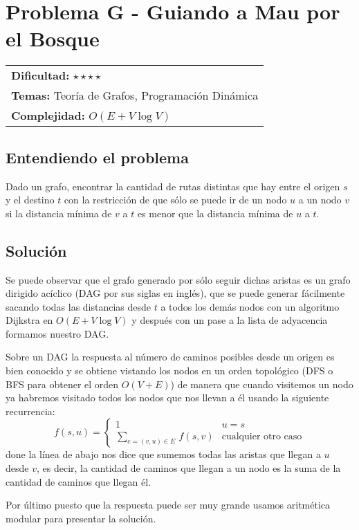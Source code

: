 \section{Problema G - Guiando a Mau por el Bosque}

\hfill
\begin{tabular}{@{}l@{}}
\textbf{Dificultad:} $\star \star \star \star$ \\
\textbf{Temas:} Teoría de Grafos, Programación Dinámica \\
\textbf{Complejidad:} $O(E + V \log V)$
\end{tabular}

\subsection*{Entendiendo el problema}
Dado un grafo, encontrar la cantidad de rutas distintas que hay entre el origen $s$ y el destino $t$ con la restricción de que sólo se puede ir de un nodo $u$ a un nodo $v$ si la distancia mínima de $v$ a $t$ es menor que la distancia mínima de $u$ a $t$.
\subsection*{Solución}
Se puede observar que el grafo generado por sólo seguir dichas aristas 
es un grafo dirigido acíclico (DAG por sus siglas en inglés), que se puede generar fácilmente sacando todas las distancias desde $t$ a todos los demás nodos con un algoritmo Dijkstra en $O(E+V \log V)$ y después con un pase a la lista de adyacencia formamos nuestro DAG.

Sobre un DAG la respuesta al número de caminos posibles desde un origen
es bien conocido y se obtiene vistando los nodos en un orden topológico (DFS o BFS para obtener el orden $O(V+E)$) de manera que cuando visitemos un nodo ya habremos visitado todos los nodos que nos llevan a él usando la siguiente recurrencia:
\[
\displaystyle f(s, u) = \begin{cases} 1 & u = s \\ \sum_{e = (v, u) \in E} \, f(s, v) & \text{cualquier otro caso} \end{cases}
\]
done la línea de abajo nos dice que sumemos todas las aristas que llegan a $u$ desde $v$, es decir, la cantidad de caminos que llegan a un nodo es la suma de la cantidad de caminos que llegan él.

Por último puesto que la respuesta puede ser muy grande usamos aritmética modular para 
presentar la solución.

